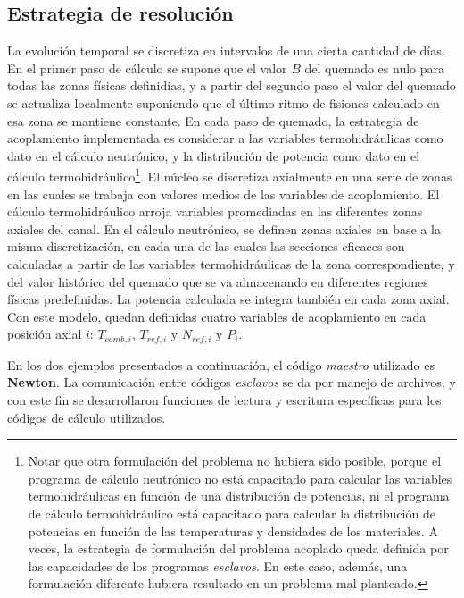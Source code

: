 \subsection*{Estrategia de resolución}
\label{3:modelo-nt}

La evolución temporal se discretiza en intervalos de una cierta cantidad de días.
En el primer paso de cálculo se supone que el valor $B$ del quemado es nulo para todas las zonas físicas definidias,
y a partir del segundo paso el valor del quemado se actualiza localmente suponiendo que el último ritmo de fisiones calculado en esa zona se mantiene constante.
En cada paso de quemado,
la estrategia de acoplamiento implementada es considerar a las variables termohidráulicas como dato en el cálculo neutrónico,
y la distribución de potencia como dato en el cálculo termohidráulico\footnote{
Notar que otra formulación del problema no hubiera sido posible,
porque el programa de cálculo neutrónico no está capacitado para calcular las variables termohidráulicas en función de una distribución de potencias,
ni el programa de cálculo termohidráulico está capacitado para calcular la distribución de potencias en función de las temperaturas y densidades de los materiales.
A veces, la estrategia de formulación del problema acoplado queda definida por las capacidades de los programas \textit{esclavos}.
En este caso, además, una formulación diferente hubiera resultado en un problema mal planteado.
}.
El núcleo se discretiza axialmente en una serie de zonas en las cuales se trabaja con valores medios de las variables de acoplamiento.
El cálculo termohidráulico arroja variables promediadas en las diferentes zonas axiales del canal.
En el cálculo neutrónico, se definen zonas axiales en base a la misma discretización,
en cada una de las cuales las secciones eficaces son calculadas a partir de las variables termohidráulicas de la zona correspondiente,
y del valor histórico del quemado que se va almacenando en diferentes regiones físicas predefinidas.
La potencia calculada se integra también en cada zona axial.
Con este modelo, quedan definidas cuatro variables de acoplamiento en cada posición axial $i$: $T_{comb,i}$, $T_{ref,i}$ y $N_{ref,i}$ y $P_i$.

En los dos ejemplos presentados a continuación, el código \textit{maestro} utilizado es \textbf{Newton}.
La comunicación entre códigos \textit{esclavos} se da por manejo de archivos,
y con este fin se desarrollaron funciones de lectura y escritura específicas para los códigos de cálculo utilizados.

